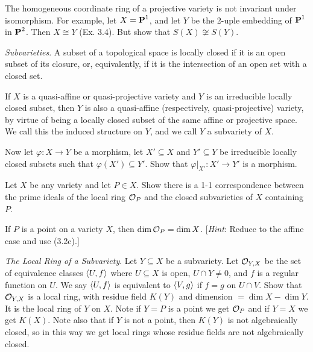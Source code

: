 \documentclass[10pt]{amsart}
\begin{document}
\begin{exercise}[3.9]
    The homogeneous coordinate ring of a projective variety is not invariant under 
    isomorphism. For example, let $X = \operatorname{\mathbf{P}}^1$, and let $Y$ be the 2-uple embedding of $\operatorname{\mathbf{P}}^1$ in $\operatorname{\mathbf{P}}^2$. 
    Then $X \cong Y$ (Ex. 3.4). But show that $S(X) \not\cong S(Y)$.
\end{exercise}

\begin{solution}
\end{solution}

\begin{exercise}[3.10]
    \emph{Subvarieties}. A subset of a topological space is locally closed if it is an 
    open subset of its closure, or, equivalently, if it is the intersection of an open set with 
    a closed set.
    
    If $X$ is a quasi-affine or quasi-projective variety and $Y$ is an irreducible locally closed 
    subset, then $Y$ is also a quasi-affine (respectively, quasi-projective) variety, by virtue 
    of being a locally closed subset of the same affine or projective space. We call this the induced 
    structure on $Y$, and we call $Y$ a subvariety of $X$.
    
    Now let $\varphi:X \to Y$ be a morphism, let $X' \subseteq X$ and $Y' \subseteq Y$ be irreducible locally closed subsets 
    such that $\varphi(X') \subseteq Y'$. Show that $\varphi|_{X'} :X' \to Y'$ 
    is a morphism.
\end{exercise}


\begin{exercise}[3.11]
    Let $X$ be any variety and let $P \in X$. Show there is a 1-1 correspondence between
    the prime ideals of the local ring $\mathcal{O}_P$ and the closed subvarieties of $X$ containing $P$.
\end{exercise}


\begin{exercise}[3.12]
    If $P$ is a point on a variety $X$, then $\dim \mathcal{O}_P = \dim X$. [\emph{Hint}: Reduce to the
    affine case and use (3.2c).]
\end{exercise}


\begin{exercise}[3.13]
    \emph{The Local Ring of a Subvariety}. Let $Y \subseteq X$ be a subvariety. Let $\mathcal{O}_{Y,X}$ be the set 
    of equivalence classes $\left\langle U,f\right\rangle$ where $U \subseteq X$ is open, $U \cap Y \ne 0$, and $f$ is a regular 
    function on $U$. We say $\left\langle U, f\right\rangle$ is equivalent to $\left\langle V, g\right\rangle$ if $f = g$ on $U \cap V$. Show that 
    $\mathcal{O}_{Y,X}$ is a local ring, with residue field $K(Y)$ and dimension $= \dim X - \dim Y$. It is the local ring 
    of $Y$ on $X$. Note if $Y = P$ is a point we get $\mathcal{O}_{P}$ and if $Y = X$ we get $K(X)$. 
    Note also that if $Y$ is not a point, then $K(Y)$ is not algebraically closed, so in this way we 
    get local rings whose residue fields are not algebraically closed.
\end{exercise}
\end{document}
